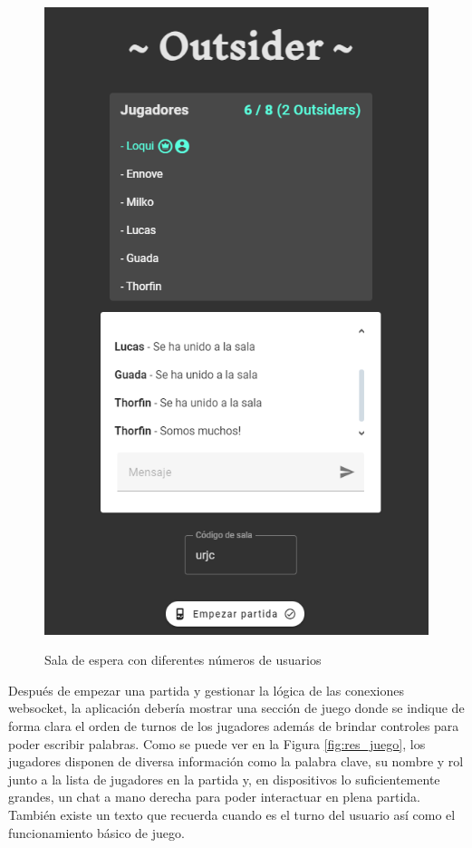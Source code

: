 \begin{figure}[h]
\begin{minipage}{0.45\textwidth}
	  \includegraphics[clip=true,width=\textwidth]{res_lobby1.png}\\
   \end{minipage}
   \caption{Sala de espera con diferentes números de usuarios}
   \label{fig:res_lobby}
 \end{figure}

Después de empezar una partida y gestionar la lógica de las conexiones websocket, la aplicación debería mostrar
una sección de juego donde se indique de forma clara el orden de turnos de los jugadores además de brindar
controles para poder escribir palabras. Como se puede ver en la Figura \ref{fig:res_juego}, los jugadores disponen
de diversa información como la palabra clave, su nombre y rol junto a la lista de jugadores en la partida y, en dispositivos
lo suficientemente grandes, un chat a mano derecha para poder interactuar en plena partida. También existe un texto que recuerda
cuando es el turno del usuario así como el funcionamiento básico de juego.

